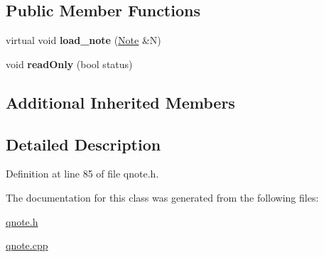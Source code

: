 \subsection*{Public Member Functions}
\begin{DoxyCompactItemize}
\item 
\mbox{\label{class_q_recording_aa6984351b5a0bceaa63be793b160c73b}} 
virtual void {\bfseries load\+\_\+note} (\hyperlink{class_note}{Note} \&N)
\item 
\mbox{\label{class_q_recording_a98fa21d8814450c0d912c8ce102ca832}} 
void {\bfseries read\+Only} (bool status)
\end{DoxyCompactItemize}
\subsection*{Additional Inherited Members}


\subsection{Detailed Description}


Definition at line 85 of file qnote.\+h.



The documentation for this class was generated from the following files\+:\begin{DoxyCompactItemize}
\item 
\hyperlink{qnote_8h}{qnote.\+h}\item 
\hyperlink{qnote_8cpp}{qnote.\+cpp}\end{DoxyCompactItemize}

